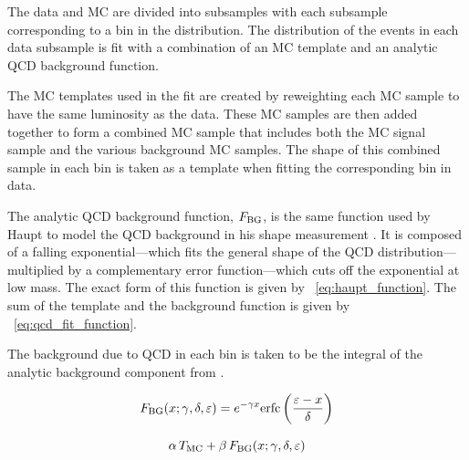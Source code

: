 The data and MC are divided into subsamples with each subsample corresponding
to a bin in the \phistar distribution. The \mee distribution of the events in
each data subsample is fit with a combination of an MC template and an analytic
QCD background function.

The MC templates used in the fit are created by reweighting each MC sample to
have the same luminosity as the data. These MC samples are then added together to
form a combined MC sample that includes both the MC \MADGRAPH signal sample and
the various background MC samples. The shape of this combined sample in each
\phistar bin is taken as a template when fitting the corresponding bin in data.

The analytic QCD background function, $F_{\text{BG}}$, is the same function used by
Haupt to model the QCD background in his \Ztoee shape measurement
\cite{haupt_2011}. It is composed of a falling exponential---which fits the
general shape of the QCD distribution---multiplied by a complementary error
function---which cuts off the exponential at low mass. The exact form of this
function is given by \EQ~\ref{eq:haupt_function}. The sum of the template and
the background function is given by \EQ~\ref{eq:qcd_fit_function}.

The background due to QCD in each \phistar bin is taken to be the integral of
the analytic background component from \MassRange. 

\begin{equation}\label{eq:haupt_function}
    F_{\text{BG}}(x; \gamma, \delta, \varepsilon) = e^{- \gamma x} {\mathrm{erfc}} \left( \frac{\varepsilon - x}{\delta} \right)
\end{equation}

\begin{equation}\label{eq:qcd_fit_function}
    \alpha \, T_{\text{MC}} + \beta \, F_{\text{BG}}(x; \gamma, \delta, \varepsilon)
\end{equation}

\TODO{\label{fig:same_sign_z_peak}}
